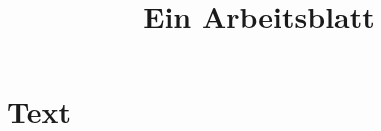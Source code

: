 \documentclass[a4paper]{scrartcl}
\title{Ein Arbeitsblatt}
\begin{document}
\section*{Text}


\end{document}
